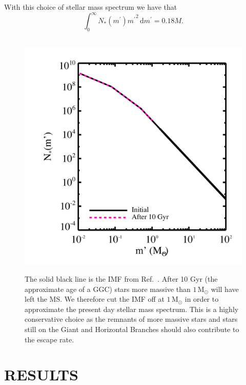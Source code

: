 \documentclass[aps,floatfix,prd,showpacs]{revtex4}
\newcommand{\diff}{\mathrm{d}}
\newcommand{\mpr}{m^\prime}
\newcommand{\Msun}{\textrm{M}_\odot}
\begin{document}
With this choice of stellar mass spectrum we have that
%
\begin{equation}
\int^\infty_0{N_*(\mpr)\mpr}^2\,\diff \mpr = 0.18M.
\end{equation}
%
\begin{figure}[htp]
\centering
\includegraphics[width=12cm, height=12cm]{IMF}
\caption{The solid black line is the IMF from Ref.~\cite{Kroupa2001}. After 10 Gyr (the approximate age of a GGC) stars more massive than $1\, \Msun$ will have left the MS. We therefore cut the IMF off at $1\, \Msun$ in order to approximate the present day stellar mass spectrum. This is a highly conservative choice as the remnants of more massive stars and stars still on the Giant and Horizontal Branches should also contribute to the escape rate.}
\label{IMF}
\end{figure}
%
%

\section{RESULTS}
\label{section:results3}
\end{document}
